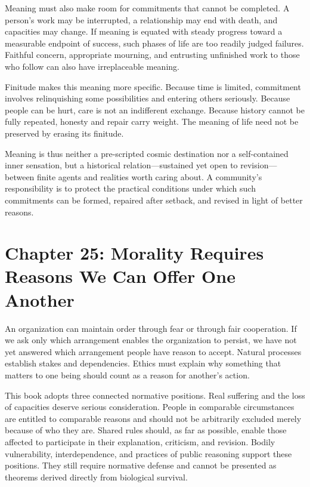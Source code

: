 \documentclass[
  english,
  11pt,
  oneside]{book}
\begin{document}
Meaning must also make room for commitments that cannot be completed. A person's work may be interrupted, a relationship may end with death, and capacities may change. If meaning is equated with steady progress toward a measurable endpoint of success, such phases of life are too readily judged failures. Faithful concern, appropriate mourning, and entrusting unfinished work to those who follow can also have irreplaceable meaning.

Finitude makes this meaning more specific. Because time is limited, commitment involves relinquishing some possibilities and entering others seriously. Because people can be hurt, care is not an indifferent exchange. Because history cannot be fully repeated, honesty and repair carry weight. The meaning of life need not be preserved by erasing its finitude.

\begingroup{}

Meaning is thus neither a pre-scripted cosmic destination nor a self-contained inner sensation, but a historical relation---sustained yet open to revision---between finite agents and realities worth caring about. A community's responsibility is to protect the practical conditions under which such commitments can be formed, repaired after setback, and revised in light of better reasons.

\par\endgroup

\chapter{Chapter 25: Morality Requires Reasons We Can Offer One Another}\label{ph-ch-25}

An organization can maintain order through fear or through fair cooperation. If we ask only which arrangement enables the organization to persist, we have not yet answered which arrangement people have reason to accept. Natural processes establish stakes and dependencies. Ethics must explain why something that matters to one being should count as a reason for another's action.

This book adopts three connected normative positions. Real suffering and the loss of capacities deserve serious consideration. People in comparable circumstances are entitled to comparable reasons and should not be arbitrarily excluded merely because of who they are. Shared rules should, as far as possible, enable those affected to participate in their explanation, criticism, and revision. Bodily vulnerability, interdependence, and practices of public reasoning support these positions. They still require normative defense and cannot be presented as theorems derived directly from biological survival.
\end{document}
